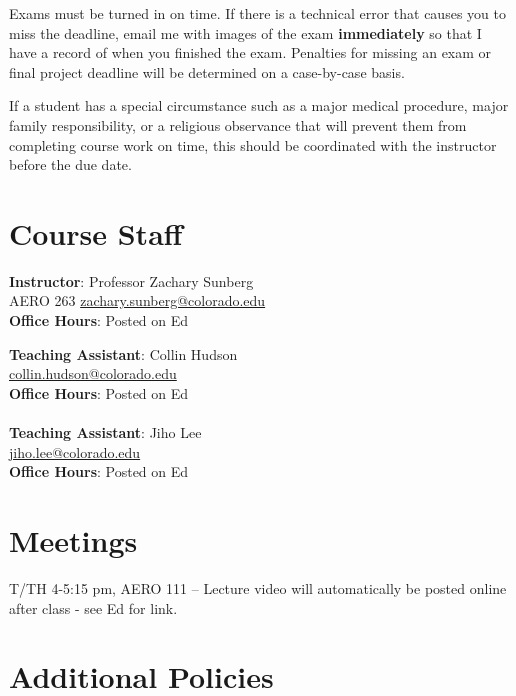 \documentclass[9pt]{article}
\begin{document}
Exams must be turned in on time. If there is a technical error that causes you to miss the deadline, email me with images of the exam \textbf{immediately} so that I have a record of when you finished the exam. Penalties for missing an exam or final project deadline will be determined on a case-by-case basis.

If a student has a special circumstance such as a major medical procedure, major family responsibility, or a religious observance that will prevent them from completing course work on time, this should be coordinated with the instructor before the due date.

\section*{Course Staff}

\begin{multicols}{2}
    \begin{minipage}{\columnwidth}
        \textbf{Instructor}: Professor Zachary Sunberg\\
        AERO 263 \href{mailto://zachary.sunberg@colorado.edu}{zachary.sunberg@colorado.edu}\\
        \textbf{Office Hours}: Posted on Ed
    \end{minipage}

    \begin{minipage}{\columnwidth}
        \textbf{Teaching Assistant}: Collin Hudson\\
        \href{mailto://collin.hudson@colorado.edu}{collin.hudson@colorado.edu}\\
        \textbf{Office Hours}: Posted on Ed\\
        \\
        \textbf{Teaching Assistant}: Jiho Lee\\
        \href{mailto://jiho.lee@colorado.edu}{jiho.lee@colorado.edu}\\
        \textbf{Office Hours}: Posted on Ed\\
    \end{minipage}
\end{multicols}

\section*{Meetings}

T/TH 4-5:15 pm, AERO 111 -- Lecture video will automatically be posted online after class - see Ed for link.

\section*{Additional Policies}

{\small
    
}
\end{document}
